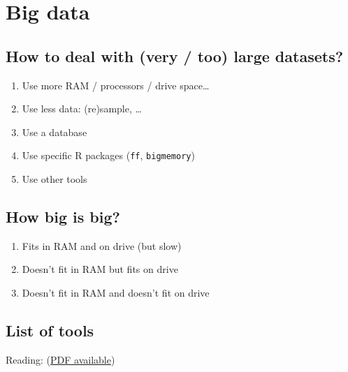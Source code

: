\documentclass[]{book}
\providecommand{\tightlist}{%
  \setlength{\itemsep}{0pt}\setlength{\parskip}{0pt}}
\theoremstyle{definition}
\theoremstyle{definition}
\theoremstyle{definition}
\theoremstyle{remark}
\begin{document}
\chapter{Big data}\label{bigdata}

\section{How to deal with (very / too) large
datasets?}\label{how-to-deal-with-very-too-large-datasets}

\begin{enumerate}
\def\labelenumi{\arabic{enumi}.}
\tightlist
\item
  Use more RAM / processors / drive space\ldots{}
\item
  Use less data: (re)sample, \ldots{}
\item
  Use a database
\item
  Use specific R packages (\texttt{ff}, \texttt{bigmemory})
\item
  Use other tools
\end{enumerate}

\section{How big is big?}\label{how-big-is-big}

\begin{enumerate}
\def\labelenumi{\arabic{enumi}.}
\tightlist
\item
  Fits in RAM and on drive (but slow)
\item
  Doesn't fit in RAM but fits on drive
\item
  Doesn't fit in RAM and doesn't fit on drive
\end{enumerate}

\section{List of tools}\label{list-of-tools}

Reading: \citet{Varian2014}
(\href{http://pubs.aeaweb.org/doi/pdfplus/10.1257/jep.28.2.3}{PDF
available})
\end{document}
